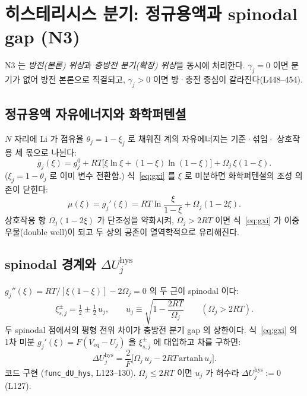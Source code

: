 \documentclass[11pt,a4paper]{article}
\newcommand{\eq}{\mathrm{eq}}
\newcommand{\hys}{\mathrm{hys}}
\begin{document}
\section{히스테리시스 분기: 정규용액과 spinodal gap (N3)}\label{sec:hys}

N3 는 \textit{방전(본론) 위상}과 \textit{충방전 분기(확장) 위상}을 동시에 처리한다.
$\gamma_j=0$ 이면 분기가 없어 방전 본론으로 직결되고, $\gamma_j>0$ 이면 방·충전
중심이 갈라진다(L448--454).

\subsection{정규용액 자유에너지와 화학퍼텐셜}

$N$ 자리에 Li 가 점유율 $\theta_j = 1-\xi_j$ 로 채워진 계의 자유에너지는 기준·섞임·
상호작용 세 몫으로 나뉜다:
\begin{equation}
\bar{g}_j(\xi) = g_j^0
+ RT\bigl[\xi\ln\xi + (1-\xi)\ln(1-\xi)\bigr]
+ \Omega_j\,\xi(1-\xi).
\label{eq:gxi}
\end{equation}
($\xi_j = 1-\theta_j$ 로 이미 변수 전환함.) 식~\eqref{eq:gxi} 를 $\xi$ 로 미분하면
화학퍼텐셜의 조성 의존이 닫힌다:
\begin{equation}
\mu(\xi) = g_j'(\xi) = RT\ln\frac{\xi}{1-\xi} + \Omega_j(1-2\xi).
\label{eq:mu}
\end{equation}
상호작용 항 $\Omega_j(1-2\xi)$ 가 단조성을 약화시켜, $\Omega_j>2RT$ 이면 식~\eqref{eq:gxi}
가 이중 우물(double well)이 되고 두 상의 공존이 열역학적으로 유리해진다.

\subsection{spinodal 경계와 $\Delta U_j^\hys$}

$g_j''(\xi)=RT/[\xi(1-\xi)]-2\Omega_j=0$ 의 두 근이 spinodal 이다:
\begin{equation}
\xi_{s,j}^\pm = \tfrac{1}{2} \pm \tfrac{1}{2}\,u_j,
\qquad u_j \equiv \sqrt{1 - \frac{2RT}{\Omega_j}}
\qquad (\Omega_j > 2RT).
\label{eq:spinodal}
\end{equation}
두 spinodal 점에서의 평형 전위 차이가 충방전 분기 gap 의 상한이다. 식~\eqref{eq:gxi}
의 1차 미분 $g_j'(\xi) = F(V_{\eq}-U_j)$ 을 $\xi_{s,j}^\pm$ 에 대입하고 차를 구하면:
\begin{equation}
\boxed{\Delta U_j^\hys = \frac{2}{F}\bigl[\Omega_j\,u_j - 2RT\,\mathrm{artanh}\,u_j\bigr].}
\label{eq:dU}
\end{equation}
코드 구현 (\texttt{func\_dU\_hys}, L123--130). $\Omega_j \le 2RT$ 이면 $u_j$ 가 허수라
$\Delta U_j^\hys := 0$ (L127).
\end{document}
